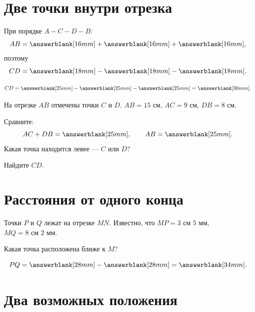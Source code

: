 \section{Две точки внутри отрезка}

\fourpointsfigure

\begin{fillbox}[Дополните]
  При порядке \(A-C-D-B\):
  \[
    AB=\answerblank[16mm]+\answerblank[16mm]+\answerblank[16mm],
  \]
  поэтому
  \[
    CD=\answerblank[18mm]-\answerblank[18mm]-\answerblank[18mm].
  \]
\end{fillbox}

\begin{practicebox}
  \studentcaseonefigure
  \[
    CD=\answerblank[25mm]-\answerblank[25mm]-\answerblank[25mm]
      =\answerblank[30mm].
  \]
\end{practicebox}

\begin{thinkbox}
  На отрезке \(AB\) отмечены точки \(C\) и \(D\).
  \(AB=15\text{ см}\), \(AC=9\text{ см}\), \(DB=8\text{ см}\).

  Сравните:
  \[
    AC+DB=\answerblank[25mm],\qquad AB=\answerblank[25mm].
  \]
  Какая точка находится левее --- \(C\) или \(D\)? \answerblank[25mm]

  Найдите \(CD\). \answerblank[40mm]
\end{thinkbox}

\section{Расстояния от одного конца}

\sameendpointfigure

\begin{practicebox}[Задание 5]
  Точки \(P\) и \(Q\) лежат на отрезке \(MN\). Известно, что
  \(MP=3\text{ см }5\text{ мм}\), \(MQ=8\text{ см }2\text{ мм}\).

  Какая точка расположена ближе к \(M\)? \answerblank[20mm]

  \[
    PQ=\answerblank[28mm]-\answerblank[28mm]=\answerblank[34mm].
  \]
\end{practicebox}

\section{Два возможных положения}

\twopositionsfigure

